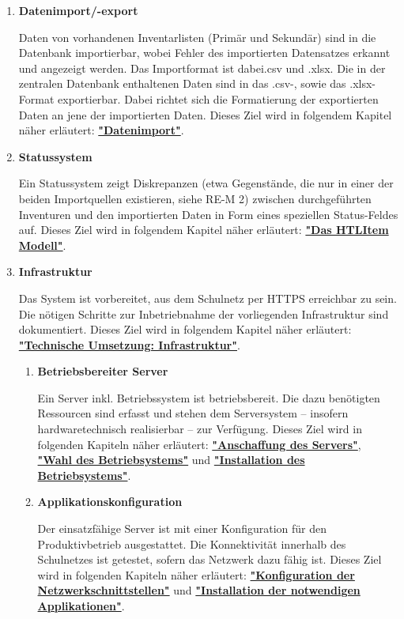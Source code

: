 \documentclass[
    headings=optiontotocandhead,%
    twoside,
    numbers=noenddot,%
    toc=flat, %
    12pt, %
    titlepage, %
    parskip=full, %
    listof=totoc, %
    listof=flat, %
    numbers=noenddot, %
    bibliography=totoc, %
    a4paper,DIV=14,
    BCOR=15mm,
]{scrbook}
\begin{document}
\begin{enumerate}
    \item \textbf{Datenimport/-export}

    Daten von vorhandenen Inventarlisten (Primär und Sekundär) sind in die Datenbank importierbar, wobei Fehler des importierten Datensatzes erkannt und angezeigt werden. Das Importformat ist dabei.csv und .xlsx. 
    Die in der zentralen Datenbank enthaltenen Daten sind in das .csv-, sowie das .xlsx-Format exportierbar. Dabei richtet sich die Formatierung der exportierten Daten an jene der importierten Daten. 
    Dieses Ziel wird in folgendem Kapitel näher erläutert: \textbf{\href{datenimport}{"Datenimport"}}.


    \item \textbf{Statussystem}

    Ein Statussystem zeigt Diskrepanzen (etwa Gegenstände, die nur in einer der beiden Importquellen existieren, siehe RE-M 2) zwischen durchgeführten Inventuren und den importierten Daten in Form eines speziellen Status-Feldes auf. 
    Dieses Ziel wird in folgendem Kapitel näher erläutert: \textbf{\href{das-htlitem-modell}{"Das HTLItem Modell"}}.



    \item \textbf{Infrastruktur}

    Das System ist vorbereitet, aus dem Schulnetz per HTTPS erreichbar zu sein. Die nötigen Schritte zur Inbetriebnahme der vorliegenden Infrastruktur sind dokumentiert. 
    Dieses Ziel wird in folgendem Kapitel näher erläutert: \textbf{\href{technische-umsetzung-infrastruktur}{"Technische Umsetzung: Infrastruktur"}}.
    
    \begin{enumerate}
      \item	\textbf{Betriebsbereiter Server}

      Ein Server inkl. Betriebssystem ist betriebsbereit. Die dazu benötigten Ressourcen sind erfasst und stehen dem Serversystem – insofern hardwaretechnisch realisierbar – zur Verfügung.
      Dieses Ziel wird in folgenden Kapiteln näher erläutert: \textbf{\href{anschaffung-des-servers}{"Anschaffung des Servers"}}, \textbf{\href{wahl-des-betriebsystemes}{"Wahl des Betriebsystems"}} und \textbf{\href{installation-des-betriebsystemes}{"Installation des Betriebsystems"}}.
    
      \item	\textbf{Applikationskonfiguration}

      Der einsatzfähige Server ist mit einer Konfiguration für den Produktivbetrieb ausgestattet. Die Konnektivität innerhalb des Schulnetzes ist getestet, sofern das Netzwerk dazu fähig ist.
      Dieses Ziel wird in folgenden Kapiteln näher erläutert: \textbf{\href{konfiguration-der-netzwerkschnittstellen}{"Konfiguration der Netzwerkschnittstellen"}} und \textbf{\href{installation-der-notwendigen-applikationen}{"Installation der notwendigen Applikationen"}}.
      

\end{enumerate}
\end{enumerate}
\end{document}
